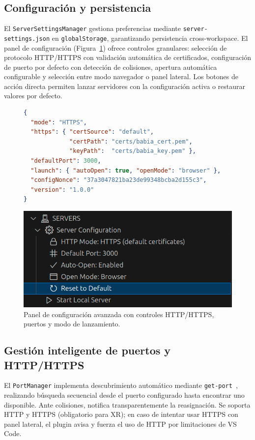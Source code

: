 \documentclass[a4paper, 12pt]{book}
\begin{document}
\subsection{Configuración y persistencia}
El \texttt{ServerSettingsManager} gestiona preferencias mediante \texttt{server-settings.json} en \texttt{globalStorage}, garantizando persistencia cross-workspace. El panel de configuración (Figura~\ref{fig:ui-server-config}) ofrece controles granulares: selección de protocolo HTTP/HTTPS con validación automática de certificados, configuración de puerto por defecto con detección de colisiones, apertura automática configurable y selección entre modo navegador o panel lateral. Los botones de acción directa permiten lanzar servidores con la configuración activa o restaurar valores por defecto.

\begin{figure}[H]
\centering
\begin{minipage}{0.9\linewidth}
\begin{lstlisting}[language=json,
caption={Configuración de servidores en Code-XR.},
label={fig:server-settings-json}]
{
  "mode": "HTTPS",
  "https": { "certSource": "default",
             "certPath": "certs/babia_cert.pem",
             "keyPath":  "certs/babia_key.pem" },
  "defaultPort": 3000,
  "launch": { "autoOpen": true, "openMode": "browser" },
  "configNonce": "37a3047821ba23de99348bcba2d155c3",
  "version": "1.0.0"
}
\end{lstlisting}
\end{minipage}
\end{figure}

\begin{figure}[H]
\centering
\includegraphics[width=0.65\linewidth]{img/ui-server-config.png}
\caption{Panel de configuración avanzada con controles HTTP/HTTPS, puertos y modo de lanzamiento.}
\label{fig:ui-server-config}
\end{figure}

\subsection{Gestión inteligente de puertos y HTTP/HTTPS}
El \texttt{PortManager} implementa descubrimiento automático mediante \texttt{get-port}~\cite{get-port}, realizando búsqueda secuencial desde el puerto configurado hasta encontrar uno disponible. Ante colisiones, notifica transparentemente la reasignación.
Se soporta HTTP y HTTPS (obligatorio para XR); en caso de intentar usar HTTPS con panel lateral, el plugin avisa y fuerza el uso de HTTP por limitaciones de VS Code.
\end{document}
